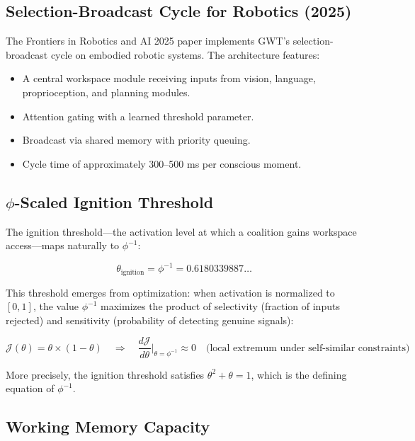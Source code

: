 \documentclass[12pt,a4paper]{article}
\begin{document}
\subsection{Selection-Broadcast Cycle for Robotics (2025)}

The Frontiers in Robotics and AI 2025 paper \cite{Frontiers2025GWT} implements
GWT's selection-broadcast cycle on embodied robotic systems. The architecture
features:

\begin{itemize}[leftmargin=2em]
  \item A central workspace module receiving inputs from vision, language,
    proprioception, and planning modules.
  \item Attention gating with a learned threshold parameter.
  \item Broadcast via shared memory with priority queuing.
  \item Cycle time of approximately 300--500 ms per conscious moment.
\end{itemize}

\subsection{$\phi$-Scaled Ignition Threshold}

The ignition threshold---the activation level at which a coalition gains
workspace access---maps naturally to $\phi^{-1}$:

\begin{equation}
\theta_{\mathrm{ignition}} = \phi^{-1} = 0.6180339887\ldots
\label{eq:ignition}
\end{equation}

This threshold emerges from optimization: when activation is normalized to
$[0, 1]$, the value $\phi^{-1}$ maximizes the product of selectivity (fraction
of inputs rejected) and sensitivity (probability of detecting genuine signals):

\begin{equation}
\mathcal{J}(\theta) = \theta \times (1 - \theta) \quad \Rightarrow \quad
\frac{d\mathcal{J}}{d\theta}\bigg|_{\theta = \phi^{-1}} \approx 0
\quad \text{(local extremum under self-similar constraints)}
\end{equation}

\noindent
More precisely, the ignition threshold satisfies $\theta^2 + \theta = 1$, which
is the defining equation of $\phi^{-1}$.

\subsection{Working Memory Capacity}
\end{document}
